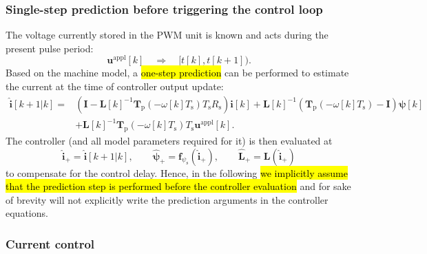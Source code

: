 \begin{frame}
    \frametitle{Single-step prediction before triggering the control loop}
    The voltage currently stored in the PWM unit is known and acts during the present pulse period:
    \begin{equation}
        \bm{u}^{\mathrm{appl}}[k] \quad \Rightarrow \quad [t[k],t[k+1]).
    \end{equation}\pause%
    Based on the machine model, a \hl{one-step prediction} can be performed to estimate the current at the time of controller output update:
    \begin{equation}
        \begin{split}
            \hat{\bm{i}}[k+1|k]={} & \left(\bm{I}-\bm{L}[k]^{-1}\bm{T}_\mathrm{p}(-\omega[k]T_\mathrm{s})T_\mathrm{s}R_\mathrm{s}\right)\bm{i}[k]
            +\bm{L}[k]^{-1}(\bm{T}_\mathrm{p}(-\omega[k]T_\mathrm{s})-\bm{I})\bm{\psi}[k]                                                         \\
                                   & +\bm{L}[k]^{-1}\bm{T}_\mathrm{p}(-\omega[k]T_\mathrm{s})T_\mathrm{s}\bm{u}^{\mathrm{appl}}[k] .
        \end{split}
        \label{eq:one_step_prediction_addendum}
    \end{equation}\pause%
    The controller (and all model parameters required for it) is then evaluated at
    \begin{equation}
        \hat{\bm{i}}_+ = \hat{\bm{i}}[k+1|k],\qquad
        \hat{\bm{\psi}}_+ = \bm{f}_{\psi_\mathrm{s}}(\hat{\bm{i}}_+),\qquad
        \hat{\bm{L}}_+ = \bm{L}(\hat{\bm{i}}_+)
    \end{equation}
    to compensate for the control delay. \pause Hence, in the following \hl{we implicitly assume that the prediction step is performed before the controller evaluation} and for sake of brevity will not explicitly write the prediction arguments in the controller equations.
\end{frame}

\subsubsection{Current control}


